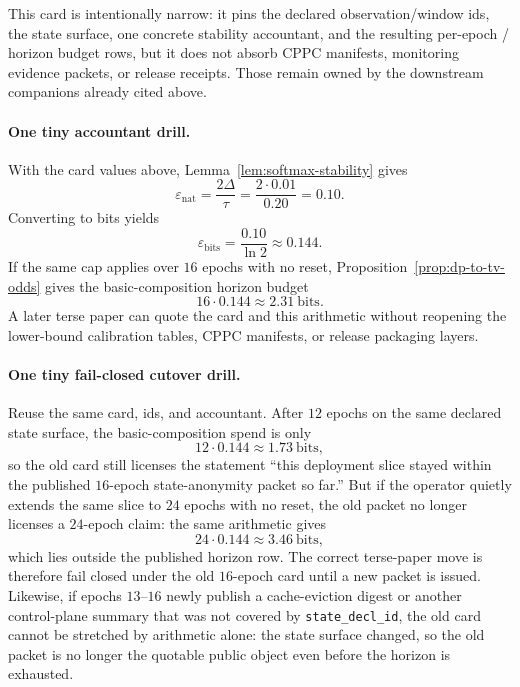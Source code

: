 \documentclass[11pt]{article}
\begin{document}
This card is intentionally narrow: it pins the declared observation/window ids, the state surface, one concrete stability accountant, and the resulting per-epoch / horizon budget rows, but it does not absorb CPPC manifests, monitoring evidence packets, or release receipts. Those remain owned by the downstream companions already cited above.\cite{series:state3,series:evalnotary,series:abomoinl,series:release}

\paragraph{One tiny accountant drill.}
With the card values above, Lemma~\ref{lem:softmax-stability} gives
\[
\varepsilon_{\mathrm{nat}} = \frac{2\Delta}{\tau} = \frac{2\cdot 0.01}{0.20} = 0.10.
\]
Converting to bits yields
\[
\varepsilon_{\mathrm{bits}} = \frac{0.10}{\ln 2} \approx 0.144.
\]
If the same cap applies over $16$ epochs with no reset, Proposition~\ref{prop:dp-to-tv-odds} gives the basic-composition horizon budget
\[
16\cdot 0.144 \approx 2.31\ \text{bits}.
\]
A later terse paper can quote the card and this arithmetic without reopening the lower-bound calibration tables, CPPC manifests, or release packaging layers.

\paragraph{One tiny fail-closed cutover drill.}
Reuse the same card, ids, and accountant. After $12$ epochs on the same declared state surface, the basic-composition spend is only
\[
12\cdot 0.144 \approx 1.73\ \text{bits},
\]
so the old card still licenses the statement ``this deployment slice stayed within the published $16$-epoch state-anonymity packet so far.''
But if the operator quietly extends the same slice to $24$ epochs with no reset, the old packet no longer licenses a $24$-epoch claim: the same arithmetic gives
\[
24\cdot 0.144 \approx 3.46\ \text{bits},
\]
which lies outside the published horizon row. The correct terse-paper move is therefore fail closed under the old $16$-epoch card until a new packet is issued.
Likewise, if epochs $13$--$16$ newly publish a cache-eviction digest or another control-plane summary that was not covered by \texttt{state\_decl\_id}, the old card cannot be stretched by arithmetic alone: the state surface changed, so the old packet is no longer the quotable public object even before the horizon is exhausted.
\end{document}
